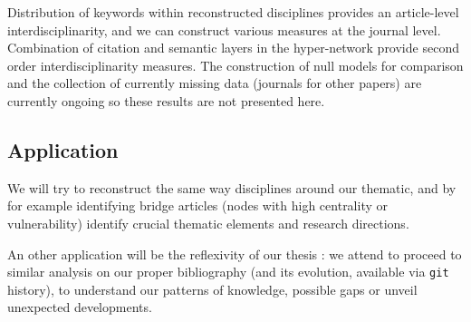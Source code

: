 Distribution of keywords within reconstructed disciplines provides an article-level interdisciplinarity, and we can construct various measures at the journal level. Combination of citation and semantic layers in the hyper-network provide second order interdisciplinarity measures. The construction of null models for comparison and the collection of currently missing data (journals for other papers) are currently ongoing so these results are not presented here.



\subsection{Application}

We will try to reconstruct the same way disciplines around our thematic, and by for example identifying bridge articles (nodes with high centrality or vulnerability) identify crucial thematic elements and research directions.

\bigskip

An other application will be the reflexivity of our thesis : we attend to proceed to similar analysis on our proper bibliography (and its evolution, available via \texttt{git} history), to understand our patterns of knowledge, possible gaps or unveil unexpected developments.


